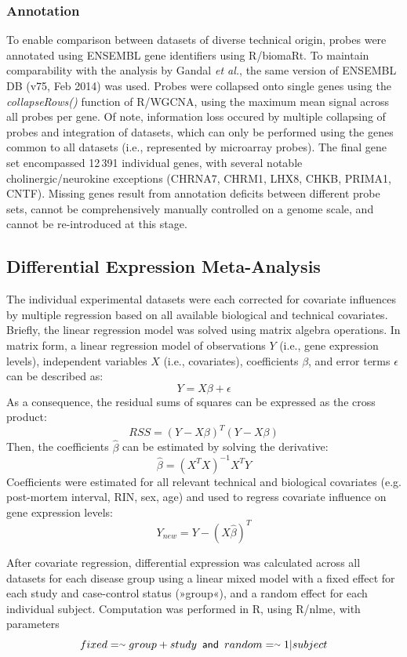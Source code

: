 \begin{method}
\subsubsection{Annotation}
To enable comparison between datasets of diverse technical origin, probes were annotated using ENSEMBL gene identifiers using R/biomaRt.\cite{Durinck2009} To maintain comparability with the analysis by Gandal \emph{et al.},\cite{Gandal2018} the same version of ENSEMBL DB (v75, Feb 2014) was used. Probes were collapsed onto single genes using the \emph{collapseRows()} function of R/WGCNA,\cite{Langfelder2008} using the maximum mean signal across all probes per gene. Of note, information loss occured by multiple collapsing of probes and integration of datasets, which can only be performed using the genes common to all datasets (i.e., represented by microarray probes). The final gene set encompassed 12\,391 individual genes, with several notable cholinergic/neurokine exceptions (CHRNA7, CHRM1, LHX8, CHKB, PRIMA1, CNTF). Missing genes result from annotation deficits between different probe sets, cannot be comprehensively manually controlled on a genome scale, and cannot be re-introduced at this stage. 

\subsection{Differential Expression Meta-Analysis}
The individual experimental datasets were each corrected for covariate influences by multiple regression based on all available biological and technical covariates. Briefly, the linear regression model was solved using matrix algebra operations. In matrix form, a linear regression model of observations $Y$ (i.e., gene expression levels), independent variables $X$ (i.e., covariates), coefficients $\beta$, and error terms $\epsilon$ can be described as: $$Y = X\beta + \epsilon$$ As a consequence, the residual sums of squares can be expressed as the cross product: $$RSS = (Y - X\beta)^T(Y - X\beta)$$ Then, the coefficients $\hat{\beta}$ can be estimated by solving the derivative: $$\hat{\beta} = (X^TX)^{-1} X^TY$$ Coefficients were estimated for all relevant technical and biological covariates (e.g. post-mortem interval, RIN, sex, age) and used to regress covariate influence on gene expression levels: $$Y_{new} = Y - (X\hat{\beta})^T$$

After covariate regression, differential expression was calculated across all datasets for each disease group using a linear mixed model with a fixed effect for each study and case-control status (»group«), and a random effect for each individual subject. Computation was performed in R, using R/nlme,\cite{Pinheiro2019} with parameters $$fixed = \smallsim group + study\textrm{\sffamily\,\,\,and\,\,\,}random = \smallsim 1|subject$$


\end{method}
